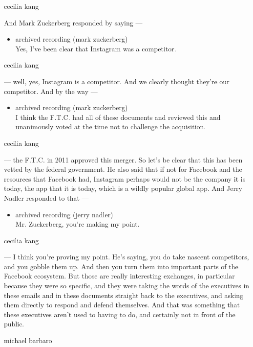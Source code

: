 cecilia kang

And Mark Zuckerberg responded by saying ---

\begin{itemize}
\tightlist
\item
  archived recording (mark zuckerberg)\\
  Yes, I've been clear that Instagram was a competitor.
\end{itemize}

cecilia kang

--- well, yes, Instagram is a competitor. And we clearly thought they're
our competitor. And by the way ---

\begin{itemize}
\tightlist
\item
  archived recording (mark zuckerberg)\\
  I think the F.T.C. had all of these documents and reviewed this and
  unanimously voted at the time not to challenge the acquisition.
\end{itemize}

cecilia kang

--- the F.T.C. in 2011 approved this merger. So let's be clear that this
has been vetted by the federal government. He also said that if not for
Facebook and the resources that Facebook had, Instagram perhaps would
not be the company it is today, the app that it is today, which is a
wildly popular global app. And Jerry Nadler responded to that ---

\begin{itemize}
\tightlist
\item
  archived recording (jerry nadler)\\
  Mr. Zuckerberg, you're making my point.
\end{itemize}

cecilia kang

--- I think you're proving my point. He's saying, you do take nascent
competitors, and you gobble them up. And then you turn them into
important parts of the Facebook ecosystem. But those are really
interesting exchanges, in particular because they were so specific, and
they were taking the words of the executives in these emails and in
these documents straight back to the executives, and asking them
directly to respond and defend themselves. And that was something that
these executives aren't used to having to do, and certainly not in front
of the public.

michael barbaro

